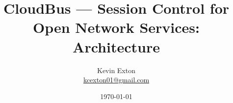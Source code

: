 \title{CloudBus --- Session Control for Open Network Services: Architecture}
\author[K. Exton]{
	\centering
	Kevin Exton\\
	\href{mailto:kcexton01@gmail.com}{\footnotesize kcexton01@gmail.com}
}
\date{\today}
\begin{frame}[plain]
	\titlepage
	\centering
\end{frame}